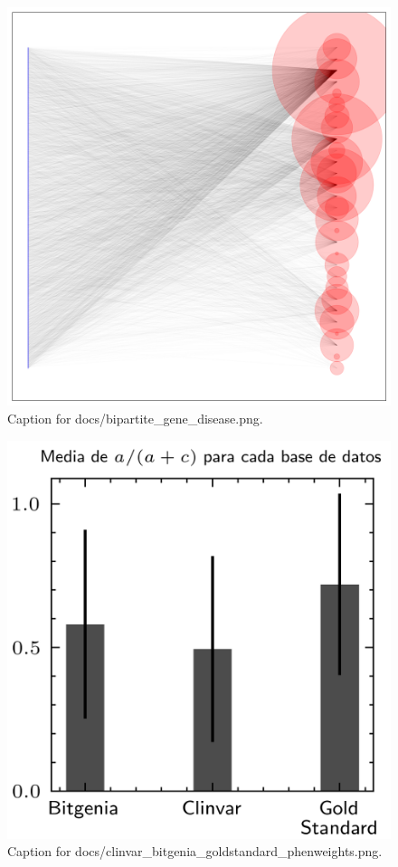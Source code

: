\documentclass{article}
\begin{document}
\begin{figure}[h] \centering \includegraphics{docs/bipartite_gene_disease.png} \caption{Caption for docs/bipartite_gene_disease.png.} \end{figure}
\begin{figure}[h] \centering \includegraphics{docs/clinvar_bitgenia_goldstandard_phenweights.png} \caption{Caption for docs/clinvar_bitgenia_goldstandard_phenweights.png.} \end{figure}
\end{document}
